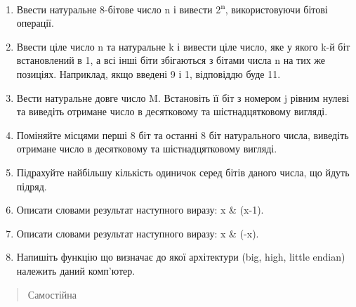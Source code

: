 \documentclass[]{article}
\begin{document}
\begin{enumerate}
\def\labelenumi{\arabic{enumi})}
\item
  \protect\hypertarget{_Hlk65235695}{}{}Ввести натуральне 8-бітове число
  n і вивести 2\textsuperscript{n}, використовуючи бітові операції.
\item
  Ввести ціле число n та натуральне k і вивести ціле число, яке у якого
  k-й біт встановлений в 1, а всі інші біти збігаються з бітами числа n
  на тих же позиціях. Наприклад, якщо введені 9 і 1, відповіддю буде 11.
\item
  Вести натуральне довге число
  \protect\hypertarget{__DdeLink__4_8035966481}{}{}M. Встановіть її біт
  з номером j рівним нулеві та виведіть отримане число в десятковому та
  шістнадцятковому вигляді.
\item
  Поміняйте місцями перші 8 біт та останні 8 біт натурального числа,
  виведіть отримане число в десятковому та шістнадцятковому вигляді.
\item
  Підрахуйте найбільшу кількість одиничок серед бітів даного числа, що
  йдуть підряд.
\item
  Описати словами результат наступного виразу: x \& (x-1).
\item
  Описати словами результат наступного виразу: x \& (-x).
\item
  Напишіть функцію що визначає до якої архітектури (big, high, little
  endian) належить даний комп'ютер.
\end{enumerate}

\begin{quote}
Самостійна
\end{quote}
\end{document}
